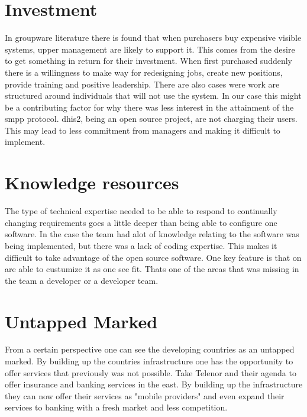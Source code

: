\section{Investment}
In groupware literature there is found that when purchasers buy expensive visible systems, upper management are likely to support it.
This comes from the desire to get something in return for their investment.
When first purchased suddenly there is a willingness to make way for redesigning jobs, create new positions, provide training and positive leadership. 
There are also cases were work are structured around individuals that will not use the system. 
\cite{groupware:grudin}
In our case this might be a contributing factor for why there was less interest in the attainment of the \gls{smpp} protocol.
\gls{dhis2}, being an open source project, are not charging their users. 
This may lead to less commitment from managers and making it difficult to implement.


\section{Knowledge resources}
The type of technical expertise needed to be able to respond to continually changing requirements goes a little deeper than being able to configure one software. 
In the case the team had alot of knowledge relating to the software was being implemented, but there was a lack of coding expertise.
This makes it difficult to take advantage of the open source software. 
One key feature is that on are able to custumize it as one see fit. 
Thats one of the areas that was missing in the team a developer or a developer team.



\section{Untapped Marked}
From a certain perspective one can see the developing countries as an untapped marked.
By building up the countries infrastructure one has the opportunity to offer services that previously was not possible.
Take Telenor and their agenda to offer insurance and banking services in the east.
By building up the infrastructure they can now offer their services as "mobile providers" and even expand their services to banking with a fresh market and less competition.
